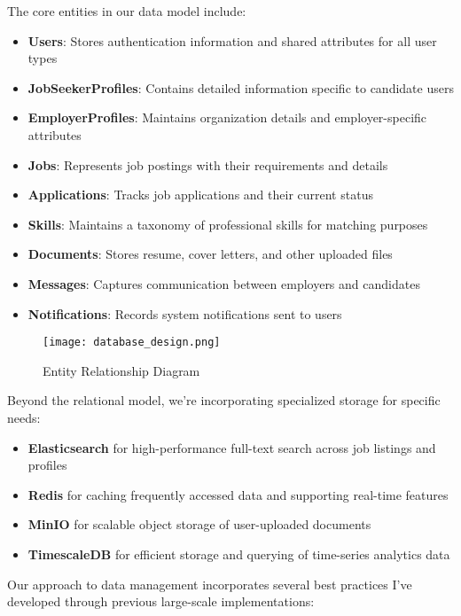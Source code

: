 \documentclass[12pt,a4paper]{article}
\begin{document}
The core entities in our data model include:

\begin{itemize}
    \item \textbf{Users}: Stores authentication information and shared attributes for all user types
    \item \textbf{JobSeekerProfiles}: Contains detailed information specific to candidate users
    \item \textbf{EmployerProfiles}: Maintains organization details and employer-specific attributes
    \item \textbf{Jobs}: Represents job postings with their requirements and details
    \item \textbf{Applications}: Tracks job applications and their current status
    \item \textbf{Skills}: Maintains a taxonomy of professional skills for matching purposes
    \item \textbf{Documents}: Stores resume, cover letters, and other uploaded files
    \item \textbf{Messages}: Captures communication between employers and candidates
    \item \textbf{Notifications}: Records system notifications sent to users
\end{itemize}

\begin{figure}[H]
\centering
\texttt{[image: database\_design.png]}
\caption{Entity Relationship Diagram}
\label{fig:er-diagram}
\end{figure}

Beyond the relational model, we're incorporating specialized storage for specific needs:

\begin{itemize}
    \item \textbf{Elasticsearch} for high-performance full-text search across job listings and profiles
    \item \textbf{Redis} for caching frequently accessed data and supporting real-time features
    \item \textbf{MinIO} for scalable object storage of user-uploaded documents
    \item \textbf{TimescaleDB} for efficient storage and querying of time-series analytics data
\end{itemize}

Our approach to data management incorporates several best practices I've developed through previous large-scale implementations:
\end{document}
